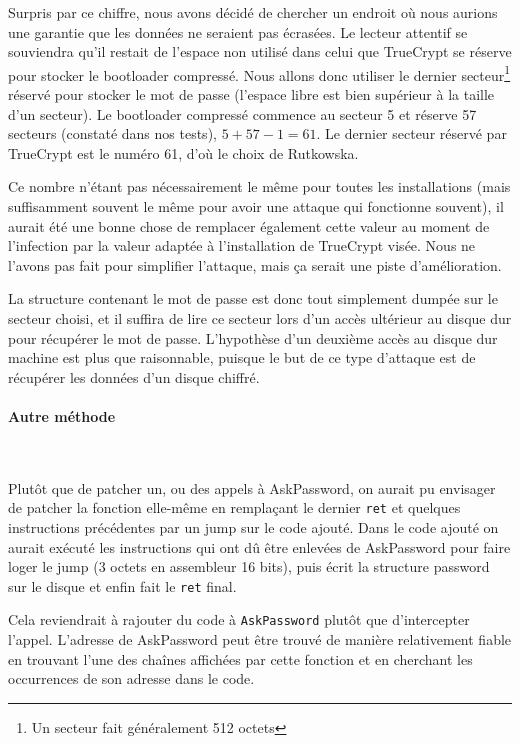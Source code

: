 \documentclass[12pt,a4paper]{article}
\begin{document}
Surpris par ce chiffre, nous avons décidé de chercher un endroit où nous aurions
une garantie que les données ne seraient pas écrasées. Le lecteur attentif se
souviendra qu'il restait de l'espace non utilisé dans celui que TrueCrypt se 
réserve pour stocker le bootloader compressé. Nous allons donc utiliser le dernier
secteur\footnote{Un secteur fait généralement 512 octets} réservé pour stocker
le mot de passe (l'espace libre est bien supérieur à la taille d'un secteur).
Le bootloader compressé commence au secteur 5 et réserve 57 secteurs (constaté
dans nos tests), $5 + 57 - 1 = 61$. Le dernier secteur réservé par TrueCrypt est le
numéro 61, d'où le choix de Rutkowska.

Ce nombre n'étant pas nécessairement le même pour toutes les installations (mais
suffisamment souvent le même pour avoir une attaque qui fonctionne souvent), il
aurait été une bonne chose de remplacer également cette valeur au moment de
l'infection par la valeur adaptée à l'installation de TrueCrypt visée. Nous ne
l'avons pas fait pour simplifier l'attaque, mais ça serait une piste
d'amélioration.

La structure contenant le mot de passe est donc tout simplement dumpée sur le
secteur choisi, et il suffira de lire ce secteur lors d'un accès ultérieur au
disque dur pour récupérer le mot de passe. L'hypothèse d'un deuxième accès au
disque dur machine est plus que raisonnable, puisque le but de ce type d'attaque
est de récupérer les données d'un disque chiffré.

\paragraph{Autre méthode}~

Plutôt que de patcher un, ou des appels à AskPassword, on aurait pu envisager
de patcher la fonction elle-même en remplaçant le dernier \texttt{ret} et 
quelques instructions précédentes par un jump sur le code ajouté. Dans le code
ajouté on aurait exécuté les instructions qui ont dû être enlevées de AskPassword
pour faire loger le jump (3 octets en assembleur 16 bits), puis écrit la structure
password sur le disque et enfin fait le \texttt{ret} final.

Cela reviendrait à rajouter du code à \texttt{AskPassword} plutôt que
d'intercepter l'appel. L'adresse de AskPassword peut être trouvé de manière
relativement fiable en trouvant l'une des chaînes affichées par cette fonction
et en cherchant les occurrences de son adresse dans le code.
\end{document}
